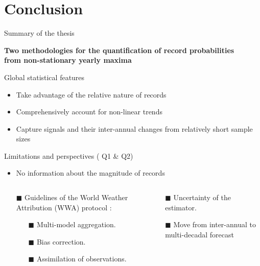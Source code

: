 \documentclass[9pt,compress]{beamer}
\begin{document}
\section{Conclusion}
\begin{frame}{Summary of the thesis}
\begin{center}
{\bf Two methodologies for the quantification of record probabilities\\ from non-stationary yearly maxima }\pause
\end{center}
\begin{block}{Global statistical features}
 \begin{itemize}
 	\item Take advantage of the relative nature of records
	\item Comprehensively account for non-linear trends
	\item Capture signals and their inter-annual changes from relatively short sample sizes
\end{itemize}
\end{block}
\pause 
\begin{block}{Limitations and perspectives ({\color{yellow@item} Q1} \&  {\color{red@item} Q2})}
 \begin{itemize}
\item No information about the magnitude of records
 \end{itemize}
\begin{columns}
\begin{column}{0.5\textwidth}
 \begin{itemize}
	\item[{\color{yellow@item}$\blacksquare$}]  Guidelines of the World Weather Attribution (WWA) protocol : 
	 \begin{itemize}
	 	\item [{\color{yellow@item}$\blacksquare$}]  Multi-model aggregation.
		\item[{\color{yellow@item}$\blacksquare$}]  Bias correction. 
		\item[{\color{yellow@item}$\blacksquare$}]  Assimilation of observations.
	 \end{itemize}
\end{itemize}
 \end{column}

 \begin{column}{0.5\textwidth}
 \begin{itemize}
	\item  [{\color{red@item}$\blacksquare$}] Uncertainty of the estimator.
	\item  [{\color{red@item}$\blacksquare$}] Move from inter-annual to multi-decadal forecast
\end{itemize} 
 \end{column}
 \end{columns}

\end{block}


\end{frame}
\end{document}
